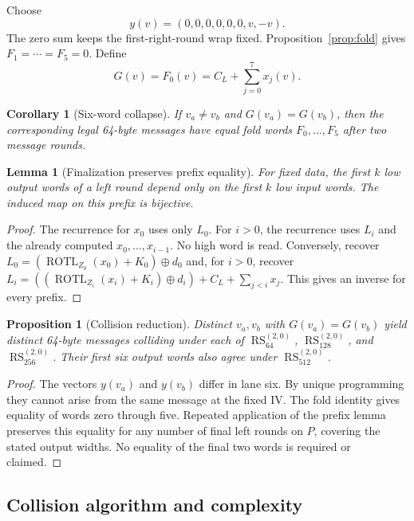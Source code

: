 \documentclass[10pt]{article}
\newtheorem{lemma}{Lemma}
\newtheorem{proposition}{Proposition}
\newtheorem{corollary}{Corollary}
\theoremstyle{definition}
\newcommand{\ROTL}{\operatorname{ROTL}}
\newcommand{\RS}{\operatorname{RS}}
\begin{document}
Choose
\begin{equation}
  y(v)=(0,0,0,0,0,0,v,-v).
  \label{eq:family}
\end{equation}
The zero sum keeps the first-right-round wrap fixed. Proposition~\ref{prop:fold} gives $F_1=\cdots=F_5=0$. Define
\begin{equation}
  G(v)=F_0(v)=C_L+\sum_{j=0}^{7}x_j(v).
  \label{eq:G}
\end{equation}

\begin{corollary}[Six-word collapse]
If $v_a\neq v_b$ and $G(v_a)=G(v_b)$, then the corresponding legal 64-byte messages have equal fold words $F_0,\ldots,F_5$ after two message rounds.
\end{corollary}

\begin{lemma}[Finalization preserves prefix equality]
For fixed data, the first $k$ low output words of a left round depend only on the first $k$ low input words. The induced map on this prefix is bijective.
\end{lemma}
\begin{proof}
The recurrence for $x_0$ uses only $L_0$. For $i>0$, the recurrence uses $L_i$ and the already computed $x_0,\ldots,x_{i-1}$. No high word is read. Conversely, recover $L_0=(\ROTL_{Z_0}(x_0)+K_0)\oplus d_0$ and, for $i>0$, recover
$L_i=((\ROTL_{Z_i}(x_i)+K_i)\oplus d_i)+C_L+\sum_{j<i}x_j$.
This gives an inverse for every prefix.
\end{proof}

\begin{proposition}[Collision reduction]\label{prop:collision}
Distinct $v_a,v_b$ with $G(v_a)=G(v_b)$ yield distinct 64-byte messages colliding under each of $\RS_{64}^{(2,0)}$, $\RS_{128}^{(2,0)}$, and $\RS_{256}^{(2,0)}$. Their first six output words also agree under $\RS_{512}^{(2,0)}$.
\end{proposition}
\begin{proof}
The vectors $y(v_a)$ and $y(v_b)$ differ in lane six. By unique programming they cannot arise from the same message at the fixed IV. The fold identity gives equality of words zero through five. Repeated application of the prefix lemma preserves this equality for any number of final left rounds on $P$, covering the stated output widths. No equality of the final two words is required or claimed.
\end{proof}

\subsection{Collision algorithm and complexity}
\end{document}
